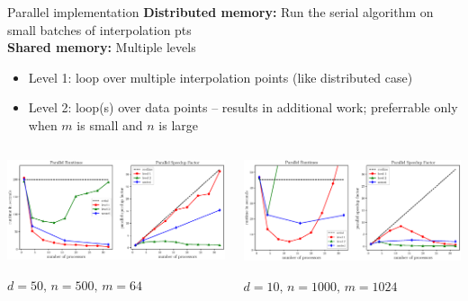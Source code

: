 \documentclass[aspectratio=169]{beamer}
\begin{document}
\begin{frame}{Parallel implementation}
\textbf{Distributed memory:} Run
the serial algorithm on small batches of interpolation pts\\
\medskip
{\bf Shared memory:} Multiple levels
\begin{itemize}
\item Level 1: loop over multiple interpolation points (like distributed case)
\item Level 2: loop(s) over data points -- results in additional work;
preferrable only when $m$ is small and $n$ is large
\end{itemize}
\begin{columns}
\begin{column}{.5\textwidth}
\includegraphics[width=\textwidth]{parallelBigD.eps}
\begin{center}$d=50\text{, }n=500\text{, }m=64$\end{center}
\end{column}
\begin{column}{.5\textwidth}
\includegraphics[width=\textwidth]{parallelBigM.eps}
\begin{center}$d=10\text{, }n=1000\text{, }m=1024$\end{center}
\end{column}
\end{columns}
\end{frame}
\end{document}
